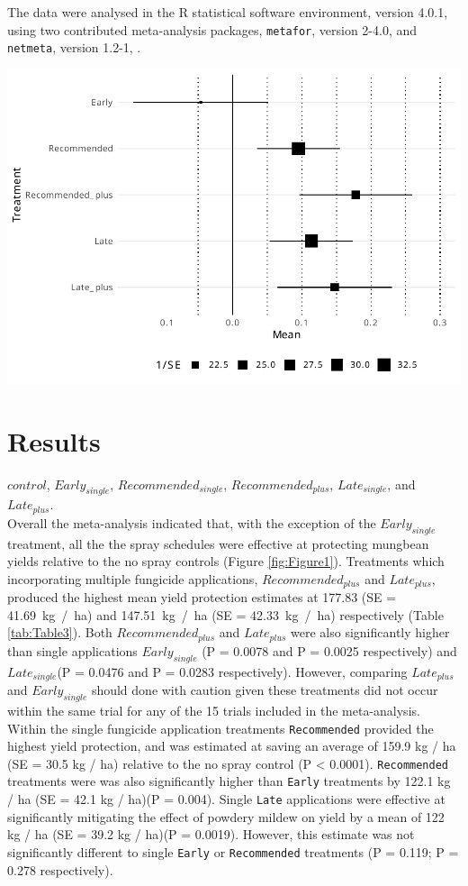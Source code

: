 \documentclass[agronomy,article,submit,moreauthors,pdftex]{mdpi}
\begin{document}
The data were analysed in the R statistical software environment, version 4.0.1, \citep{RCoreTeam2020} using two contributed meta-analysis packages, \texttt{metafor}, version 2-4.0, \citep{Viechtbauer2010} and \texttt{netmeta}, version 1.2-1, \citep{Rucker2020}.

\includegraphics{paper_files/figure-latex/Figure1-1.pdf}

\hypertarget{results}{%
\section{Results}\label{results}}

\(control\), \(Early_{single}\), \(Recommended_{single}\), \(Recommended_{plus}\), \(Late_{single}\), and \(Late_{plus}\).\\
Overall the meta-analysis indicated that, with the exception of the \(Early_{single}\) treatment, all the the spray schedules were effective at protecting mungbean yields relative to the no spray controls (Figure \ref{fig:Figure1}).
Treatments which incorporating multiple fungicide applications, \(Recommended_{plus}\) and \(Late_{plus}\), produced the highest mean yield protection estimates at 177.83 (SE = 41.69~kg~/~ha) and 147.51~kg~/~ha (SE = 42.33~kg~/~ha) respectively (Table \ref{tab:Table3}).
Both \(Recommended_{plus}\) and \(Late_{plus}\) were also significantly higher than single applications \(Early_{single}\) (P = 0.0078 and P = 0.0025 respectively) and \(Late_{single}\)(P = 0.0476 and P = 0.0283 respectively).
However, comparing \(Late_{plus}\) and \(Early_{single}\) should done with caution given these treatments did not occur within the same trial for any of the 15 trials included in the meta-analysis.
Within the single fungicide application treatments \texttt{Recommended} provided the highest yield protection, and was estimated at saving an average of 159.9 kg / ha (SE = 30.5 kg / ha) relative to the no spray control (P \textless{} 0.0001).
\texttt{Recommended} treatments were was also significantly higher than \texttt{Early} treatments by 122.1 kg / ha (SE = 42.1 kg / ha)(P = 0.004).
Single \texttt{Late} applications were effective at significantly mitigating the effect of powdery mildew on yield by a mean of 122 kg / ha (SE = 39.2 kg / ha)(P = 0.0019).
However, this estimate was not significantly different to single \texttt{Early} or \texttt{Recommended} treatments (P = 0.119; P = 0.278 respectively).
\end{document}
